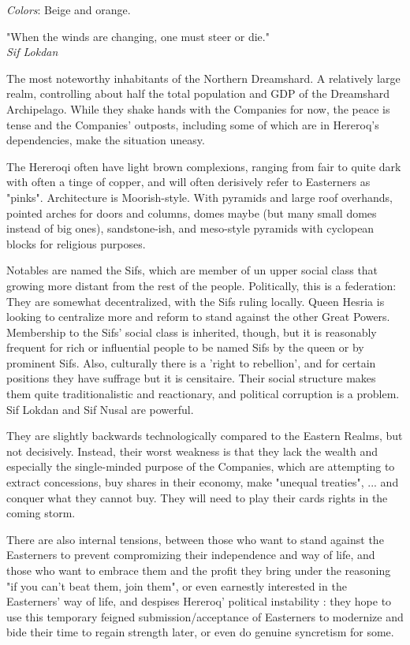 \textit{Colors}: Beige and orange.


\begin{rpg-quotebox}
    "When the winds are changing, one must steer or die." \\ \textendash \textit{Sif Lokdan}
\end{rpg-quotebox}


The most noteworthy inhabitants of the Northern Dreamshard. A relatively large realm, controlling about half the total population and GDP of the Dreamshard Archipelago. While they shake hands with the Companies for now, the peace is tense and the Companies' outposts, including some of which are in Hereroq's dependencies, make the situation uneasy.

The Hereroqi often have light brown complexions, ranging from fair to quite dark with often a tinge of copper, and will often derisively refer to Easterners as "pinks". Architecture is Moorish-style. With pyramids and large roof overhands, pointed arches for doors and columns, domes maybe (but many small domes instead of big ones), sandstone-ish, and meso-style pyramids with cyclopean blocks for religious purposes.

Notables are named the Sifs, which are member of un upper social class that growing more distant from the rest of the people. Politically, this is a federation: They are somewhat decentralized, with the Sifs ruling locally. Queen Hesria is looking to centralize more and reform to stand against the other Great Powers. Membership to the Sifs' social class is inherited, though, but it is reasonably frequent for rich or influential people to be named Sifs by the queen or by prominent Sifs. Also, culturally there is a 'right to rebellion', and for certain positions they have suffrage but it is censitaire. Their social structure makes them quite traditionalistic and reactionary, and political corruption is a problem. Sif Lokdan and Sif Nusal are powerful.

They are slightly backwards technologically compared to the Eastern Realms, but not decisively. Instead, their worst weakness is that they lack the wealth and especially the single-minded purpose of the Companies, which are attempting to extract concessions, buy shares in their economy, make "unequal treaties", ... and conquer what they cannot buy. They will need to play their cards rights in the coming storm. 

There are also internal tensions, between those who want to stand against the Easterners to prevent compromizing their independence and way of life, and those who want to embrace them and the profit they bring under the reasoning "if you can't beat them, join them", or even earnestly interested in the Easterners' way of life, and despises Hereroq' political instability : they hope to use this temporary feigned submission/acceptance of Easterners to modernize and bide their time to regain strength later, or even do genuine syncretism for some.

